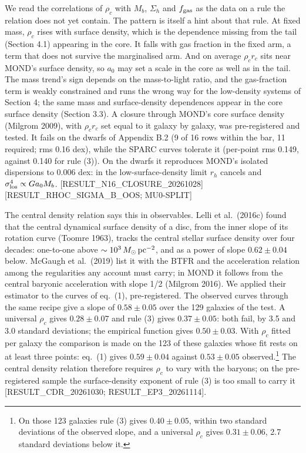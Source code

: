 \documentclass[
  10pt,
]{article}
\begin{document}
We read the correlations of $\rho_c$ with $M_b$, $\Sigma_h$ and $f_{\rm gas}$ as the data on a rule the relation does not yet contain. The pattern is itself a hint about that rule. At fixed mass, $\rho_c$ rises with surface density, which is the dependence missing from the tail (Section 4.1) appearing in the core. It falls with gas fraction in the fixed arm, a term that does not survive the marginalised arm. And on average $\rho_c r_c$ sits near MOND's surface density, so $a_0$ may set a scale in the core as well as in the tail. The mass trend's sign depends on the mass-to-light ratio, and the gas-fraction term is weakly constrained and runs the wrong way for the low-density systems of Section 4; the same mass and surface-density dependences appear in the core surface density (Section 3.3). A closure through MOND's core surface density (Milgrom 2009), with $\rho_c r_c$ set equal to it galaxy by galaxy, was pre-registered and tested. It fails on the dwarfs of Appendix B.2 (9 of 16 rows within the bar, 11 required; rms 0.16 dex), while the SPARC curves tolerate it (per-point rms 0.149, against 0.140 for rule (3)). On the dwarfs it reproduces MOND's isolated dispersions to 0.006 dex: in the low-surface-density limit $r_h$ cancels and $\sigma_{\rm los}^4 \propto G a_0 M_b$. {[}RESULT\_N16\_CLOSURE\_20261028{]} {[}RESULT\_RHOC\_SIGMA\_B\_OOS; MU0-SPLIT{]}

The central density relation says this in observables. Lelli et al.~(2016c) found that the central dynamical surface density of a disc, from the inner slope of its rotation curve (Toomre 1963), tracks the central stellar surface density over four decades: one-to-one above $\sim10^3\,M_\odot\,{\rm pc}^{-2}$, and as a power of slope $0.62\pm0.04$ below. McGaugh et al.~(2019) list it with the BTFR and the acceleration relation among the regularities any account must carry; in MOND it follows from the central baryonic acceleration with slope 1/2 (Milgrom 2016). We applied their estimator to the curves of eq.~(1), pre-registered. The observed curves through the same recipe give a slope of $0.58\pm0.05$ over the 129 galaxies of the test. A universal $\rho_c$ gives $0.28\pm0.07$ and rule (3) gives $0.37\pm0.05$: both fail, by 3.5 and 3.0 standard deviations; the empirical function gives $0.50\pm0.03$. With $\rho_c$ fitted per galaxy the comparison is made on the 123 of these galaxies whose fit rests on at least three points: eq.~(1) gives $0.59\pm0.04$ against $0.53\pm0.05$ observed.\footnote{On those 123 galaxies rule (3) gives $0.40\pm0.05$, within two standard deviations of the observed slope, and a universal $\rho_c$ gives $0.31\pm0.06$, 2.7 standard deviations below it.} The central density relation therefore requires $\rho_c$ to vary with the baryons; on the pre-registered sample the surface-density exponent of rule (3) is too small to carry it {[}RESULT\_CDR\_20261030; RESULT\_EP3\_20261114{]}.
\end{document}
